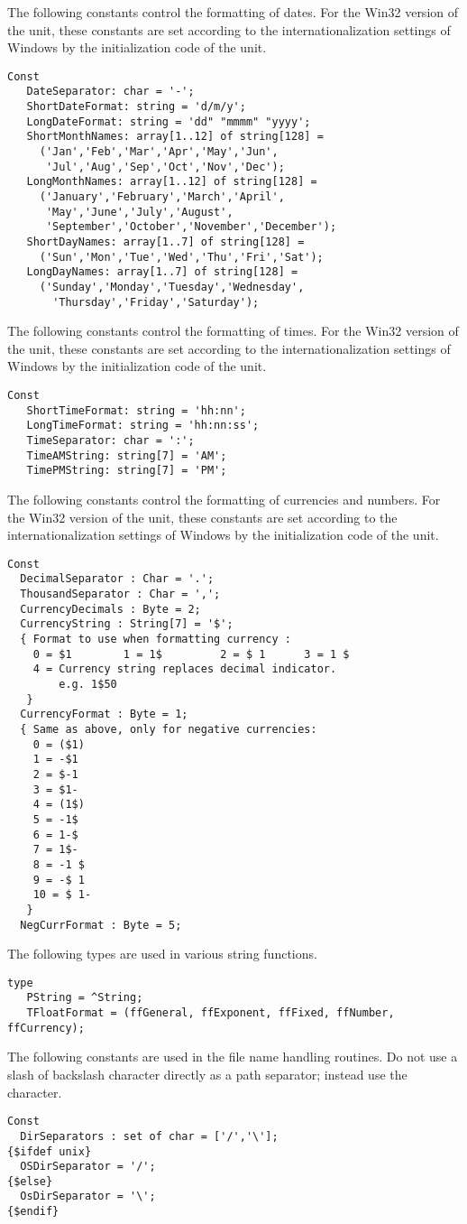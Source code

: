 The following constants control the formatting of dates.
For the Win32 version of the  unit, these
constants are set according to the internationalization
settings of Windows by the initialization code of the unit.
\begin{verbatim}
Const
   DateSeparator: char = '-';
   ShortDateFormat: string = 'd/m/y';
   LongDateFormat: string = 'dd" "mmmm" "yyyy';
   ShortMonthNames: array[1..12] of string[128] =
     ('Jan','Feb','Mar','Apr','May','Jun',
      'Jul','Aug','Sep','Oct','Nov','Dec');
   LongMonthNames: array[1..12] of string[128] =
     ('January','February','March','April',
      'May','June','July','August',
      'September','October','November','December');
   ShortDayNames: array[1..7] of string[128] =
     ('Sun','Mon','Tue','Wed','Thu','Fri','Sat');
   LongDayNames: array[1..7] of string[128] =
     ('Sunday','Monday','Tuesday','Wednesday',
       'Thursday','Friday','Saturday');
\end{verbatim}

The following constants control the formatting of times.
For the Win32 version of the  unit, these
constants are set according to the internationalization
settings of Windows by the initialization code of the unit.
\begin{verbatim}
Const
   ShortTimeFormat: string = 'hh:nn';
   LongTimeFormat: string = 'hh:nn:ss';
   TimeSeparator: char = ':';
   TimeAMString: string[7] = 'AM';
   TimePMString: string[7] = 'PM';
\end{verbatim}

The following constants control the formatting of currencies
and numbers. For the Win32 version of the  unit,
these  constants are set according to the internationalization
settings of Windows by the initialization code of the unit.
\begin{verbatim}
Const
  DecimalSeparator : Char = '.';
  ThousandSeparator : Char = ',';
  CurrencyDecimals : Byte = 2;
  CurrencyString : String[7] = '$';
  { Format to use when formatting currency :
    0 = $1        1 = 1$         2 = $ 1      3 = 1 $
    4 = Currency string replaces decimal indicator.
        e.g. 1$50
   }
  CurrencyFormat : Byte = 1;
  { Same as above, only for negative currencies:
    0 = ($1)
    1 = -$1
    2 = $-1
    3 = $1-
    4 = (1$)
    5 = -1$
    6 = 1-$
    7 = 1$-
    8 = -1 $
    9 = -$ 1
    10 = $ 1-
   }
  NegCurrFormat : Byte = 5;
\end{verbatim}
The following types are used in various string functions.
\begin{verbatim}
type
   PString = ^String;
   TFloatFormat = (ffGeneral, ffExponent, ffFixed, ffNumber, ffCurrency);
\end{verbatim}
The following constants are used in the file name handling routines. Do not
use a slash of backslash character directly as a path separator; instead
use the  character.
\begin{verbatim}
Const
  DirSeparators : set of char = ['/','\'];
{$ifdef unix}
  OSDirSeparator = '/';
{$else}
  OsDirSeparator = '\';
{$endif}
\end{verbatim}

